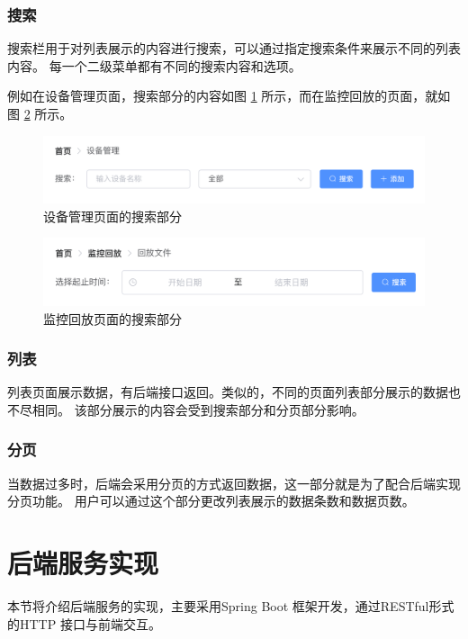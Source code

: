 \subsubsection{搜索}
搜索栏用于对列表展示的内容进行搜索，可以通过指定搜索条件来展示不同的列表内容。
每一个二级菜单都有不同的搜索内容和选项。

例如在设备管理页面，搜索部分的内容如图 \ref{Fig:search_device} 所示，而在监控回放的页面，就如图 
\ref{Fig:search_replay} 所示。

\begin{figure}[ht]
    \centering
    \includegraphics[width=0.9\linewidth]{./Figure/IMG_search_device.png}
    \caption{设备管理页面的搜索部分}\label{Fig:search_device}
\end{figure}

\begin{figure}[ht]
    \centering
    \includegraphics[width=0.9\linewidth]{./Figure/IMG_search_replay.png}
    \caption{监控回放页面的搜索部分}\label{Fig:search_replay}
\end{figure}

\subsubsection{列表}
列表页面展示数据，有后端接口返回。类似的，不同的页面列表部分展示的数据也不尽相同。
该部分展示的内容会受到搜索部分和分页部分影响。

\subsubsection{分页}
当数据过多时，后端会采用分页的方式返回数据，这一部分就是为了配合后端实现分页功能。
用户可以通过这个部分更改列表展示的数据条数和数据页数。

\newpage
\section{后端服务实现}
本节将介绍后端服务的实现，主要采用Spring Boot 框架开发，通过RESTful形式的HTTP 接口与前端交互。
